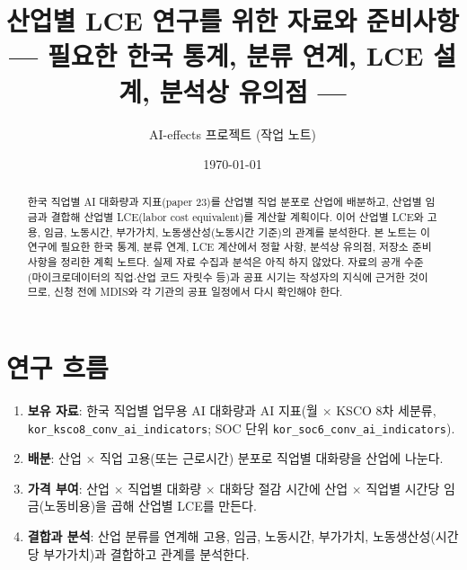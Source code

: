 \documentclass[11pt]{article}
\title{산업별 LCE 연구를 위한 자료와 준비사항\\[2mm]
\large --- 필요한 한국 통계, 분류 연계, LCE 설계, 분석상 유의점 ---}
\author{AI-effects 프로젝트 (작업 노트)}
\date{\today}
\begin{document}
\maketitle


\noindent{}


\begin{abstract}
\noindent 한국 직업별 AI 대화량과 지표(paper 23)를 산업별 직업 분포로 산업에 배분하고, 산업별 임금과 결합해 산업별 LCE(labor cost equivalent)를 계산할 계획이다. 이어 산업별 LCE와 고용, 임금, 노동시간, 부가가치, 노동생산성(노동시간 기준)의 관계를 분석한다. 본 노트는 이 연구에 필요한 한국 통계, 분류 연계, LCE 계산에서 정할 사항, 분석상 유의점, 저장소 준비사항을 정리한 계획 노트다. 실제 자료 수집과 분석은 아직 하지 않았다. 자료의 공개 수준(마이크로데이터의 직업$\cdot$산업 코드 자릿수 등)과 공표 시기는 작성자의 지식에 근거한 것이므로, 신청 전에 MDIS와 각 기관의 공표 일정에서 다시 확인해야 한다.
\end{abstract}

\tableofcontents

\section{연구 흐름}

\begin{enumerate}[leftmargin=*]
  \item \textbf{보유 자료}: 한국 직업별 업무용 AI 대화량과 AI 지표(월 $\times$ KSCO 8차 세분류, \texttt{kor\_ksco8\_conv\_ai\_indicators}; SOC 단위 \texttt{kor\_soc6\_conv\_ai\_indicators}).
  \item \textbf{배분}: 산업 $\times$ 직업 고용(또는 근로시간) 분포로 직업별 대화량을 산업에 나눈다.
  \item \textbf{가격 부여}: 산업 $\times$ 직업별 대화량 $\times$ 대화당 절감 시간에 산업 $\times$ 직업별 시간당 임금(노동비용)을 곱해 산업별 LCE를 만든다.
  \item \textbf{결합과 분석}: 산업 분류를 연계해 고용, 임금, 노동시간, 부가가치, 노동생산성(시간당 부가가치)과 결합하고 관계를 분석한다.
\end{enumerate}
\end{document}
